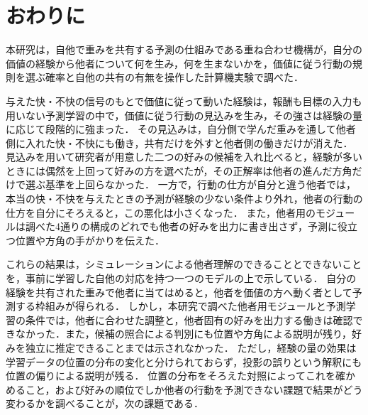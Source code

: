 \section{おわりに}\label{sec:conclusion}
本研究は，自他で重みを共有する予測の仕組みである重ね合わせ機構\cite{noguchi2022superposition}が，自分の価値の経験から他者について何を生み，何を生まないかを，価値に従う行動の規則を選ぶ確率と自他の共有の有無を操作した計算機実験で調べた．

与えた快・不快の信号のもとで価値に従って動いた経験は，報酬も目標の入力も用いない予測学習の中で，価値に従う行動の見込みを生み，その強さは経験の量に応じて段階的に強まった．
その見込みは，自分側で学んだ重みを通して他者側に入れた快・不快にも働き，共有だけを外すと他者側の働きだけが消えた．
見込みを用いて研究者が用意した二つの好みの候補を入れ比べると，経験が多いときには偶然を上回って好みの方を選べたが，その正解率は他者の進んだ方角だけで選ぶ基準を上回らなかった．
一方で，行動の仕方が自分と違う他者では，本当の快・不快を与えたときの予測が経験の少ない条件より外れ，他者の行動の仕方を自分にそろえると，この悪化は小さくなった．
また，他者用のモジュールは調べた4通りの構成のどれでも他者の好みを出力に書き出さず，予測に役立つ位置や方角の手がかりを伝えた．

これらの結果は，シミュレーションによる他者理解のできることとできないことを，事前に学習した自他の対応を持つ一つのモデルの上で示している．
自分の経験を共有された重みで他者に当てはめると，他者を価値の方へ動く者として予測する枠組みが得られる．
しかし，本研究で調べた他者用モジュールと予測学習の条件では，他者に合わせた調整と，他者固有の好みを出力する働きは確認できなかった．また，候補の照合による判別にも位置や方角による説明が残り，好みを独立に推定できることまでは示されなかった．
ただし，経験の量の効果は学習データの位置の分布の変化と分けられておらず，投影の誤りという解釈にも位置の偏りによる説明が残る．
位置の分布をそろえた対照によってこれを確かめること，および好みの順位でしか他者の行動を予測できない課題で結果がどう変わるかを調べることが，次の課題である．
